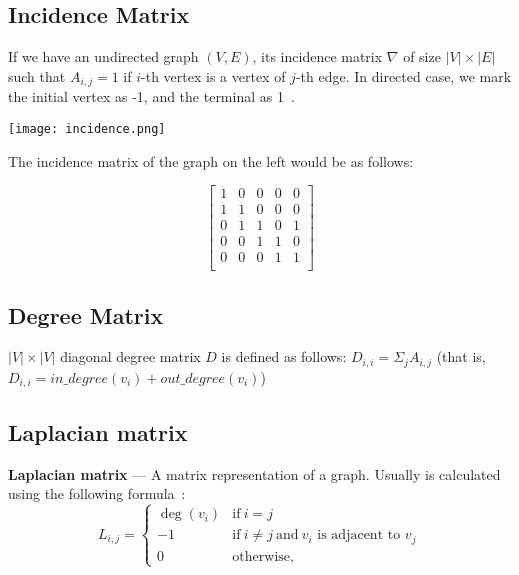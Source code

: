 \subsection*{Incidence Matrix}

If we have an undirected graph $(V, E)$, its incidence matrix $\nabla$ of size $\lvert V \rvert \times \lvert E \rvert$ such that $A_{i, j} = 1$ if $i$-th vertex is a vertex of $j$-th edge.
In directed case, we mark the initial vertex as -1, and the terminal as 1~\cite{wiki_incidence}.

\begin{multicols}{2}
	\texttt{[image: incidence.png]}

	The incidence matrix of the graph on the left would be as follows:

	\[
		\begin{bmatrix}
			1 & 0 & 0 & 0 & 0 \\
			1 & 1 & 0 & 0 & 0 \\
			0 & 1 & 1 & 0 & 1 \\
			0 & 0 & 1 & 1 & 0 \\
			0 & 0 & 0 & 1 & 1 \\
		\end{bmatrix}
	\]

\end{multicols}


\subsection*{Degree Matrix}

$\lvert V \rvert \times \lvert V \rvert$ diagonal degree matrix $D$ is defined as follows: $D_{i,i} = \Sigma_j A_{i, j}$ (that is, $D_{i, i} = in\_degree(v_i) + out\_degree(v_i)$)


\subsection*{Laplacian matrix}

\textbf{Laplacian matrix} --- A matrix representation of a graph.
Usually is calculated using the following formula~\cite{wiki_laplacian}:
\begin{equation*}
	L_{i, j} =
	\begin{cases}
		\deg(v_i) & \mbox{if}\ i = j                                                 \\
		-1        & \mbox{if}\ i \neq j\ \mbox{and}\ v_i \mbox{ is adjacent to } v_j \\
		0         & \mbox{otherwise},
	\end{cases}
\end{equation*}

